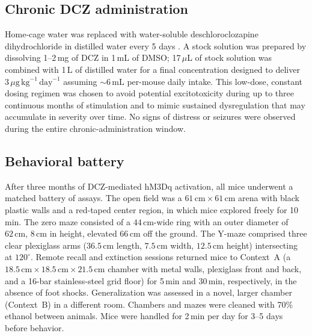 \documentclass[11pt]{article}
\begin{document}
\subsection{Chronic DCZ administration}
Home-cage water was replaced with water-soluble deschloroclozapine dihydrochloride in distilled water every 5 days \citep{nagai2020dcz,roth2016dreadds}. A stock solution was prepared by dissolving 1--2\,mg of DCZ in 1\,mL of DMSO; 17\,$\mu$L of stock solution was combined with 1\,L of distilled water for a final concentration designed to deliver $3\,\mu\mathrm{g}\,\mathrm{kg}^{-1}\,\mathrm{day}^{-1}$ assuming $\sim\!6\,\mathrm{mL}$ per-mouse daily intake. This low-dose, constant dosing regimen was chosen to avoid potential excitotoxicity during up to three continuous months of stimulation and to mimic sustained dysregulation that may accumulate in severity over time. No signs of distress or seizures were observed during the entire chronic-administration window.

\subsection{Behavioral battery}
After three months of DCZ-mediated hM3Dq activation, all mice underwent a matched battery of assays. The open field was a $61\,\mathrm{cm}\times 61\,\mathrm{cm}$ arena with black plastic walls and a red-taped center region, in which mice explored freely for 10\,min. The zero maze consisted of a $44\,\mathrm{cm}$-wide ring with an outer diameter of $62\,\mathrm{cm}$, $8\,\mathrm{cm}$ in height, elevated $66\,\mathrm{cm}$ off the ground. The Y-maze comprised three clear plexiglass arms ($36.5\,\mathrm{cm}$ length, $7.5\,\mathrm{cm}$ width, $12.5\,\mathrm{cm}$ height) intersecting at $120^{\circ}$. Remote recall and extinction sessions returned mice to Context~A (a $18.5\,\mathrm{cm}\times 18.5\,\mathrm{cm}\times 21.5\,\mathrm{cm}$ chamber with metal walls, plexiglass front and back, and a 16-bar stainless-steel grid floor) for 5\,min and 30\,min, respectively, in the absence of foot shocks. Generalization was assessed in a novel, larger chamber (Context~B) in a different room. Chambers and mazes were cleaned with 70\% ethanol between animals. Mice were handled for 2\,min per day for 3--5 days before behavior.
\end{document}
